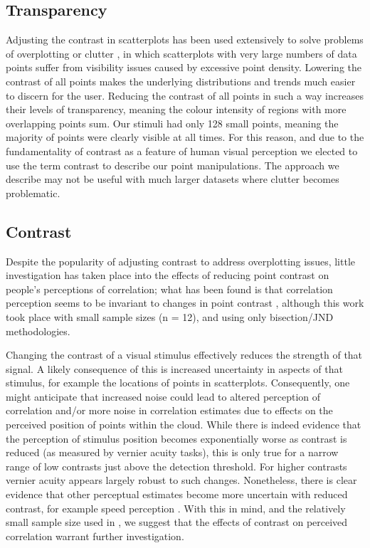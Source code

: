 \documentclass[preprint, 3p,
authoryear]{elsarticle} %
\begin{document}
\hypertarget{transparency}{%
\subsection{Transparency}\label{transparency}}

Adjusting the contrast in scatterplots has been used extensively to
solve problems of overplotting or clutter
\citep{matejka_2015, bertini_2004}, in which scatterplots with very
large numbers of data points suffer from visibility issues caused by
excessive point density. Lowering the contrast of all points makes the
underlying distributions and trends much easier to discern for the user.
Reducing the contrast of all points in such a way increases their levels
of transparency, meaning the colour intensity of regions with more
overlapping points sum. Our stimuli had only 128 small points, meaning
the majority of points were clearly visible at all times. For this
reason, and due to the fundamentality of contrast as a feature of human
visual perception \citep{ginsburg_2003} we elected to use the term
contrast to describe our point manipulations. The approach we describe
may not be useful with much larger datasets where clutter becomes
problematic.

\hypertarget{contrast}{%
\subsection{Contrast}\label{contrast}}

Despite the popularity of adjusting contrast to address overplotting
issues, little investigation has taken place into the effects of
reducing point contrast on people's perceptions of correlation; what has
been found is that correlation perception seems to be invariant to
changes in point contrast \citep{rensink_2012}, although this work took
place with small sample sizes (n = 12), and using only bisection/JND
methodologies.

Changing the contrast of a visual stimulus effectively reduces the
strength of that signal. A likely consequence of this is increased
uncertainty in aspects of that stimulus, for example the locations of
points in scatterplots. Consequently, one might anticipate that
increased noise could lead to altered perception of correlation and/or
more noise in correlation estimates due to effects on the perceived
position of points within the cloud. While there is indeed evidence
\citep{wehrhahn_1990} that the perception of stimulus position becomes
exponentially worse as contrast is reduced (as measured by vernier
acuity tasks), this is only true for a narrow range of low contrasts
just above the detection threshold. For higher contrasts vernier acuity
appears largely robust to such changes. Nonetheless, there is clear
evidence that other perceptual estimates become more uncertain with
reduced contrast, for example speed perception \citep{champion_2017}.
With this in mind, and the relatively small sample size used in
\citet{rensink_2012}, we suggest that the effects of contrast on
perceived correlation warrant further investigation.
\end{document}
